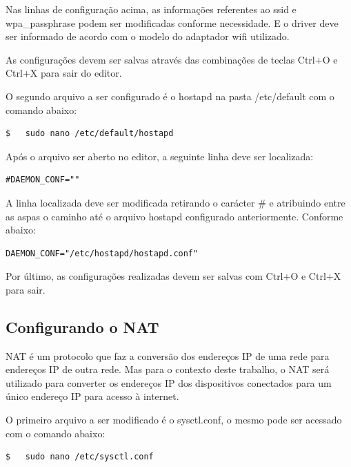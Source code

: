 Nas linhas de configuração acima, as informações referentes ao ssid e wpa\_passphrase podem ser modificadas conforme necessidade. E o driver deve ser informado de acordo com o modelo do adaptador wifi utilizado.

As configurações devem ser salvas através das combinações de teclas Ctrl+O e Ctrl+X para sair do editor.

O segundo arquivo a ser configurado é o hostapd na pasta /etc/default com o comando abaixo: \\

\begin{lstlisting}[language=bash]
$   sudo nano /etc/default/hostapd
\end{lstlisting}

Após o arquivo ser aberto no editor, a seguinte linha deve ser localizada: \\

\begin{lstlisting}
#DAEMON_CONF="" 
\end{lstlisting}

A linha localizada deve ser modificada retirando o carácter \# e atribuindo entre as aspas o caminho até o arquivo hostapd configurado anteriormente. Conforme abaixo: \\

\begin{lstlisting}
DAEMON_CONF="/etc/hostapd/hostapd.conf"
\end{lstlisting}

Por último, as configurações realizadas devem ser salvas com Ctrl+O e Ctrl+X para sair.

\subsection{Configurando o NAT}
\label{sec:configurando-nat}

NAT é um protocolo que faz a conversão dos endereços IP de uma rede para endereços IP de outra rede. Mas para o contexto deste trabalho, o NAT será utilizado para converter os endereços IP dos dispositivos conectados para um único endereço IP para acesso à internet.

O primeiro arquivo a ser modificado é o sysctl.conf, o mesmo pode ser acessado com o comando abaixo: \\

\begin{lstlisting}[language=bash]
$   sudo nano /etc/sysctl.conf
\end{lstlisting}

